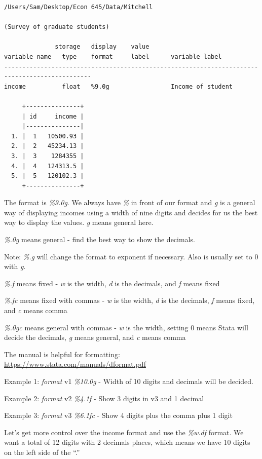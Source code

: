 \documentclass[
]{book}
\begin{document}
\begin{verbatim}
/Users/Sam/Desktop/Econ 645/Data/Mitchell

(Survey of graduate students)

              storage   display    value
variable name   type    format     label      variable label
----------------------------------------------------------------------------------------------
income          float   %9.0g                 Income of student

     +---------------+
     | id     income |
     |---------------|
  1. |  1   10500.93 |
  2. |  2   45234.13 |
  3. |  3    1284355 |
  4. |  4   124313.5 |
  5. |  5   120102.3 |
     +---------------+
\end{verbatim}

The format is \emph{\%9.0g}. We always have \emph{\%} in front of our format and \emph{g} is a general way of displaying incomes using a width of nine digits and decides for us the best way to display the values. \emph{g} means general here.

\emph{\%.0g} means general - find the best way to show the decimals.

Note: \emph{\%.g} will change the format to exponent if necessary. Also \emph{} is usually set to 0 with \emph{g}.

\emph{\%.f} means fixed - \emph{w} is the width, \emph{d} is the decimals, and \emph{f} means fixed

\emph{\%.fc} means fixed with commas - \emph{w} is the width, \emph{d} is the decimals, \emph{f} means fixed, and \emph{c} means comma

\emph{\%.0gc} means general with commas - \emph{w} is the width, setting 0 means Stata will decide the decimals, \emph{g} means general, and \emph{c} means comma

The manual is helpful for formatting: \url{https://www.stata.com/manuals/dformat.pdf}

Example 1: \emph{format} v1 \emph{\%10.0g} - Width of 10 digits and decimals will be decided.

Example 2: \emph{format} v2 \emph{\%4.1f} - Show 3 digits in v3 and 1 decimal

Example 3: \emph{format} v3 \emph{\%6.1fc} - Show 4 digits plus the comma plus 1 digit

Let's get more control over the income format and use the \emph{\%w.df} format. We want a total of 12 digits with 2 decimals places, which means we have 10 digits on the left side of the ``.''
\end{document}
